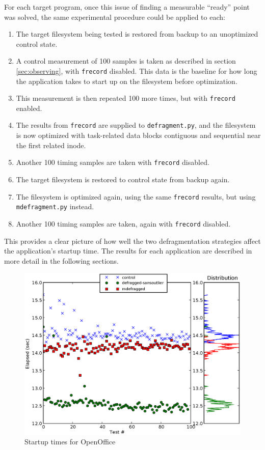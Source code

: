 \documentclass[10pt,twocolumn,letterpaper]{article}
\begin{document}
For each target program, once this issue of finding a measurable ``ready'' point was solved,
the same experimental procedure could be applied to each:

\begin{enumerate}
\item The target filesystem being tested is restored from backup to an unoptimized control state.
\item A control measurement of 100 samples is taken as described in section \ref{sec:observing}, with \texttt{frecord} disabled. This data is the baseline for how long the application takes to start up
on the filesystem before optimization.
\item This measurement is then repeated 100 more times, but with \texttt{frecord} enabled.
\item The results from \texttt{frecord} are supplied to \texttt{defragment.py}, and the filesystem is now optimized with task-related data blocks contiguous and sequential near the first related inode.
\item Another 100 timing samples are taken with \texttt{frecord} disabled.
\item The target filesystem is restored to control state from backup again.
\item The filesystem is optimized again, using the same \texttt{frecord} results, but using \texttt{mdefragment.py} instead.
\item Another 100 timing samples are taken, again with \texttt{frecord} disabled.
\end{enumerate}

This provides a clear picture of how well the two defragmentation strategies affect the application's startup time. The results for each application are described in more detail in the following sections.

\begin{figure}[!htb]
\includegraphics[scale=0.75]{openoffice-chart.eps}
\caption{Startup times for OpenOffice}
\label{oochart}
\end{figure}
\end{document}
